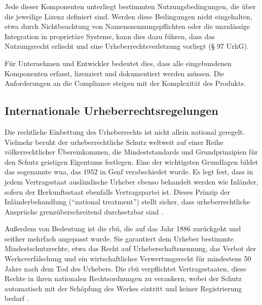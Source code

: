 Jede dieser Komponenten unterliegt bestimmten Nutzungsbedingungen, die über die jeweilige Lizenz definiert sind.
Werden diese Bedingungen nicht eingehalten, etwa durch Nichtbeachtung von Namensnennungspflichten oder die unzulässige Integration in proprietäre Systeme, kann dies dazu führen, dass das Nutzungsrecht erlischt und eine Urheberrechtsverletzung vorliegt (§ 97 UrhG).

Für Unternehmen und Entwickler bedeutet dies, dass alle eingebundenen Komponenten erfasst, lizenziert und dokumentiert werden müssen.
Die Anforderungen an die Compliance steigen mit der Komplexität des Produkts.


\subsection{Internationale Urheberrechtsregelungen}

Die rechtliche Einbettung des Urheberrechts ist nicht allein national geregelt.
Vielmehr beruht der urheberrechtliche Schutz weltweit auf einer Reihe völkerrechtlicher Übereinkommen, die Mindeststandards und Grundprinzipien für den Schutz geistigen Eigentums festlegen.
Eine der wichtigsten Grundlagen bildet das sogenannte \gls{wua}, das 1952 in Genf verabschiedet wurde.
Es legt fest, dass in jedem Vertragsstaat ausländische Urheber ebenso behandelt werden wie Inländer, sofern der Herkunftsstaat ebenfalls Vertragspartei ist.
Dieses Prinzip der Inländerbehandlung (\enquote{national treatment}) stellt sicher, dass urheberrechtliche Ansprüche grenzüberschreitend durchsetzbar sind \autocite{meckel_definition_nodate}.

Außerdem von Bedeutung ist die \gls{rbü}, die auf das Jahr 1886 zurückgeht und seither mehrfach angepasst wurde.
Sie garantiert dem Urheber bestimmte Mindestschutzrechte, etwa das Recht auf Urheberschaftsnennung, das Verbot der Werksverfälschung und ein wirtschaftliches Verwertungsrecht für mindestens 50 Jahre nach dem Tod des Urhebers.
Die \gls{rbü} verpflichtet Vertragsstaaten, diese Rechte in ihren nationalen Rechtsordnungen zu verankern, wobei der Schutz automatisch mit der Schöpfung des Werkes eintritt und keiner Registrierung bedarf \autocite{meckel_definition_nodate-1}.

